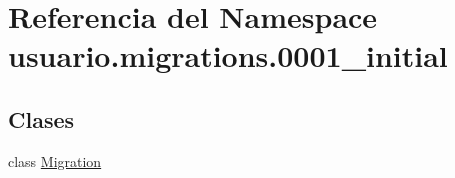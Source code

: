 \hypertarget{namespaceusuario_1_1migrations_1_10001__initial}{}\section{Referencia del Namespace usuario.\+migrations.0001\+\_\+initial}
\label{namespaceusuario_1_1migrations_1_10001__initial}
\subsection*{Clases}
\begin{DoxyCompactItemize}
\item 
class \hyperlink{classusuario_1_1migrations_1_10001__initial_1_1_migration}{Migration}
\end{DoxyCompactItemize}
